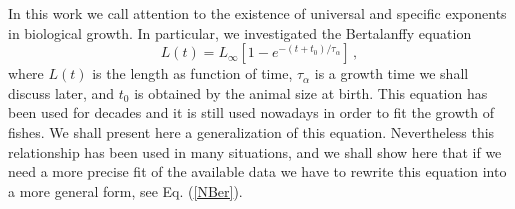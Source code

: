 \documentclass[12pt]{iopart}
\begin{document}
In this work we call attention to the existence of universal and specific exponents in biological growth. In particular, we investigated the Bertalanffy equation \cite{Bertalanffy38a,Bertalanffy57}
\begin{equation}
L(t) = L_\infty \left[ 1 - e^{-(t+t_0)/\tau_\alpha} \right]\,,
\label{Ber}
\end{equation}
where $L(t)$ is the length as function of time, $\tau_\alpha$ is a growth time we shall discuss later, and $t_0$ is obtained by the animal size at birth. This equation has been used for decades and it is still used nowadays  in order to fit
the growth of fishes. We shall present here a generalization of this equation. Nevertheless this relationship has been used in many situations, and we shall show here that if we need a more precise fit of the available data we have to rewrite this equation into a more general form, see
Eq. (\ref{NBer}).
\end{document}
